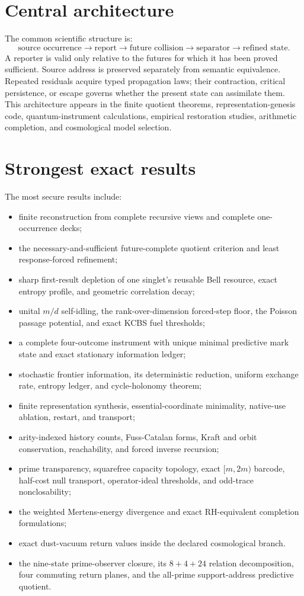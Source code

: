 \documentclass[11pt,a4paper]{article}
\begin{document}
\section{Central architecture}
The common scientific structure is:
\begin{equation}
\text{source occurrence}\to\text{report}\to\text{future collision}\to\text{separator}\to\text{refined state}.
\end{equation}
A reporter is valid only relative to the futures for which it has been proved sufficient. Source address is preserved separately from semantic equivalence. Repeated residuals acquire typed propagation laws; their contraction, critical persistence, or escape governs whether the present state can assimilate them. This architecture appears in the finite quotient theorems, representation-genesis code, quantum-instrument calculations, empirical restoration studies, arithmetic completion, and cosmological model selection.

\section{Strongest exact results}
The most secure results include:
\begin{itemize}
\item finite reconstruction from complete recursive views and complete one-occurrence decks;
\item the necessary-and-sufficient future-complete quotient criterion and least response-forced refinement;
\item sharp first-result depletion of one singlet's reusable Bell resource, exact entropy profile, and geometric correlation decay;
\item unital $m/d$ self-idling, the rank-over-dimension forced-step floor, the Poisson passage potential, and exact KCBS fuel thresholds;
\item a complete four-outcome instrument with unique minimal predictive mark state and exact stationary information ledger;
\item stochastic frontier information, its deterministic reduction, uniform exchange rate, entropy ledger, and cycle-holonomy theorem;
\item finite representation synthesis, essential-coordinate minimality, native-use ablation, restart, and transport;
\item arity-indexed history counts, Fuss-Catalan forms, Kraft and orbit conservation, reachability, and forced inverse recursion;
\item prime transparency, squarefree capacity topology, exact $[m,2m)$ barcode, half-cost null transport, operator-ideal thresholds, and odd-trace nonclosability;
\item the weighted Mertens-energy divergence and exact RH-equivalent completion formulations;
\item exact dust-vacuum return values inside the declared cosmological branch.
\item the nine-state prime-observer closure, its $8+4+24$ relation decomposition, four commuting return planes, and the all-prime support-address predictive quotient.
\end{itemize}
\end{document}
